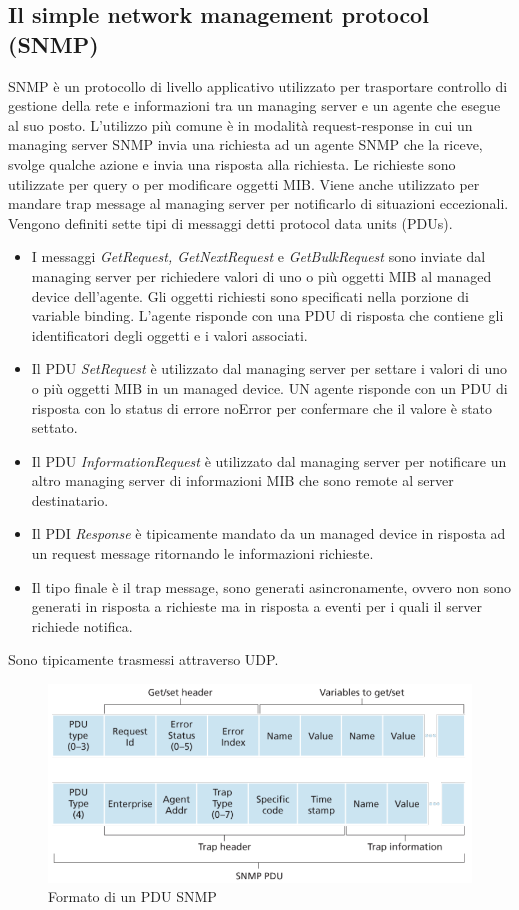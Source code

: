 \subsection{Il simple network management protocol (SNMP)}
SNMP \`e un protocollo di livello applicativo utilizzato per trasportare controllo di gestione della rete e informazioni  tra un managing server e un agente che esegue al suo posto. L'utilizzo pi\`u comune \`e in
modalit\`a request-response in cui un managing server SNMP invia una richiesta ad un agente SNMP che la riceve, svolge qualche azione e invia una risposta alla richiesta. Le richieste sono utilizzate per query o 
per modificare oggetti MIB. Viene anche utilizzato per mandare trap message al managing server per notificarlo di situazioni eccezionali. Vengono definiti sette tipi di messaggi detti protocol data units (PDUs).
\begin{itemize}
\item I messaggi \emph{GetRequest, GetNextRequest} e \emph{GetBulkRequest} sono inviate dal managing server per richiedere valori di uno o pi\`u oggetti MIB al managed device dell'agente. Gli oggetti 
richiesti sono specificati nella porzione di variable binding. L'agente risponde con una PDU di risposta che contiene gli identificatori degli oggetti e i valori associati.
\item Il PDU \emph{SetRequest} \`e utilizzato dal managing server per settare i valori di uno o pi\`u oggetti MIB in un managed device. UN agente risponde con un PDU di risposta con lo status di errore
noError per confermare che il valore \`e stato settato. 
\item Il PDU \emph{InformationRequest} \`e utilizzato dal managing server per notificare un altro managing server di informazioni MIB che sono remote al server destinatario.
\item Il PDI \emph{Response} \`e tipicamente mandato da un managed device in risposta ad un request message ritornando le informazioni richieste.
\item Il tipo finale \`e il trap message, sono generati asincronamente, ovvero non sono generati in risposta a richieste ma in risposta a eventi per i quali il server richiede notifica. 
\end{itemize}
Sono tipicamente trasmessi attraverso UDP.
\begin{figure}[h]
\includegraphics[width=\textwidth]{SNMPPDUFormato.png}
\caption{Formato di un PDU SNMP}
\end{figure}